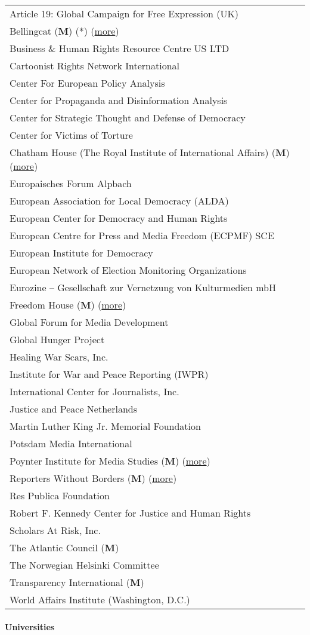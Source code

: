 \begin{longtable}[]{@{}l@{}}
\toprule
\endhead
Article 19: Global Campaign for Free Expression (UK)\tabularnewline
Bellingcat (\textbf{M}) (*)
(\href{https://wikispooks.com/wiki/Bellingcat}{more})\tabularnewline
Business \& Human Rights Resource Centre US LTD\tabularnewline
Cartoonist Rights Network International\tabularnewline
Center For European Policy Analysis\tabularnewline
Center for Propaganda and Disinformation Analysis\tabularnewline
Center for Strategic Thought and Defense of Democracy\tabularnewline
Center for Victims of Torture\tabularnewline
Chatham House (The Royal Institute of International Affairs)
(\textbf{M})
(\href{https://en.wikipedia.org/wiki/Chatham_House}{more})\tabularnewline
Europaisches Forum Alpbach\tabularnewline
European Association for Local Democracy (ALDA)\tabularnewline
European Center for Democracy and Human Rights\tabularnewline
European Centre for Press and Media Freedom (ECPMF) SCE\tabularnewline
European Institute for Democracy\tabularnewline
European Network of Election Monitoring Organizations\tabularnewline
Eurozine -- Gesellschaft zur Vernetzung von Kulturmedien
mbH\tabularnewline
Freedom House (\textbf{M})
(\href{https://en.wikipedia.org/wiki/Freedom_House}{more})\tabularnewline
Global Forum for Media Development\tabularnewline
Global Hunger Project\tabularnewline
Healing War Scars, Inc.\tabularnewline
Institute for War and Peace Reporting (IWPR)\tabularnewline
International Center for Journalists, Inc.\tabularnewline
Justice and Peace Netherlands\tabularnewline
Martin Luther King Jr. Memorial Foundation\tabularnewline
Potsdam Media International\tabularnewline
Poynter Institute for Media Studies (\textbf{M})
(\href{https://en.wikipedia.org/wiki/Poynter_Institute}{more})\tabularnewline
Reporters Without Borders (\textbf{M})
(\href{https://www.voltairenet.org/article165297.html}{more})\tabularnewline
Res Publica Foundation\tabularnewline
Robert F. Kennedy Center for Justice and Human Rights\tabularnewline
Scholars At Risk, Inc.\tabularnewline
The Atlantic Council (\textbf{M})\tabularnewline
The Norwegian Helsinki Committee\tabularnewline
Transparency International (\textbf{M})\tabularnewline
World Affairs Institute (Washington, D.C.)\tabularnewline
\bottomrule
\end{longtable}

\hypertarget{universities}{%
\paragraph{Universities}\label{universities}}

